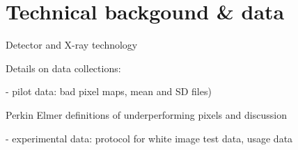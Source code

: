 \documentclass[../../IO-Pixels.tex]{subfiles}
\begin{document}
\section{Technical backgound \& data}
\begin{outline}
Detector and X-ray technology

Details on data collections: 

- pilot data: bad pixel maps, mean and SD files)

  Perkin Elmer definitions of underperforming pixels and discussion
  
- experimental data: protocol for white image test data, usage data
\end{outline}
\end{document}
